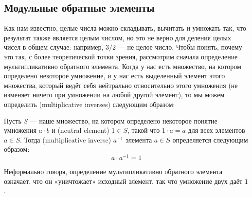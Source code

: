 \subsection{Модульные обратные элементы}
\label{sec:modular_inverses}
Как нам известно, целые числа можно складывать, вычитать и умножать так, что результат также является целым числом, но это не верно для деления целых чисел в общем случае: например, $3/2$ — не целое число. Чтобы понять, почему это так, с более теоретической точки зрения, рассмотрим сначала определение мультипликативно обратного элемента. Когда у нас есть множество, на котором определено некоторое умножение, и у нас есть выделенный элемент этого множества, который ведёт себя нейтрально относительно этого умножения (не изменяет ничего при умножении на любой другой элемент), то мы можем определить  (multiplicative inverses) следующим образом:

\begin{definition}

Пусть $S$ — наше множество, на котором определено некоторое понятие умножения $a\cdot b$ и  (neutral element) $1\in S$, такой что $1\cdot a = a$ для всех элементов $a\in S$. Тогда  (multiplicative inverse) $a^{-1}$ элемента $a\in S$ определяется следующим образом:
\begin{equation}
a\cdot a^{-1} = 1
\end{equation}
\end{definition}
Неформально говоря, определение мультипликативно обратного элемента означает, что он «уничтожает» исходный элемент, так что умножение двух даёт $1$.


